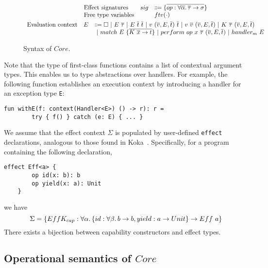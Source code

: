 \documentclass[acmsmall,review,screen]{acmart}
\newcommand{\vor}{~|~}
\newcommand{\ap}{~}
\begin{document}
\begin{figure}
\begin{gather*}
\begin{array}{lrl}
            \text{Effect signatures} & sig &\Coloneqq \{\overline{op : \forall\overline{\alpha}\ldotp\overline{\tau}\to\sigma}\} \\
            \text{Free type variables} & & ftv(\cdot) \\
        \end{array}\\
        \begin{array}{ccl}
            \text{Evaluation context} & E & \Coloneqq \square \vor E \ap \overline{\tau} \vor E \ap \overline{t}\ap \overline{t} \vor v \ap (\overline{v}, E, \overline{t}) \ap \overline{t} \vor v \ap \overline{v} \ap (\overline{v}, E, \overline{t}) \vor K\ap\overline{\tau}\ap(\overline{v}, E, \overline{t}) \\
            && \vor match\ap E\ap \{\overline{K\ap\overline{x}\to t}\} \vor perform~op~x~\overline{\tau}~(\overline{v}, E, \overline{t}) \vor handler_m ~ E
        \end{array}
    \end{gather*}
    \caption{Syntax of $Core$.}
    \label{fig:core-syntax}
\end{figure}

Note that the type of first-class functions contains a list of contextual argument types.
This enables us to type abstractions over handlers.
For example, the following function establishes an execution context by introducing a handler for an exception type \texttt{E}:
\begin{lstlisting}[language=colang]
    fun withE(f: context(Handler<E>) () -> r): r =
        try { f() } catch (e: E) { ... }
\end{lstlisting}

We assume that the effect context $\Sigma$ is populated by user-defined \texttt{effect} declarations, analogous to those found in Koka~\cite{leijen2017type}.
Specifically, for a program containing the following declaration,
\begin{lstlisting}[language=colang]
    effect Eff<a> {
        op id(x: b): b
        op yield(x: a): Unit
    }
\end{lstlisting}
we have \[\Sigma = \{EffK_{cap} : \forall\alpha\ldotp\{id : \forall\beta\ldotp b\to b, yield : a \to Unit\} \to Eff\ap a\}\]
There exists a bijection between capability constructors and effect types.

\subsection{Operational semantics of $Core$} \label{subsec:core-operational}
\end{document}
